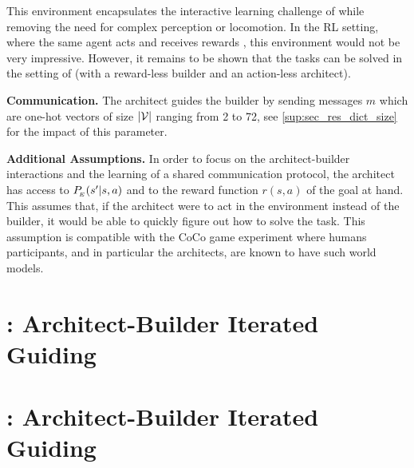 This environment encapsulates the interactive learning challenge of \abp while removing the need for complex perception or locomotion. 
In the RL setting, where the same agent acts and receives rewards%
, this environment would not be very impressive. However, it remains to be shown that the tasks can be solved in the %
setting of \abp (with a reward-less builder and an action-less architect).

\textbf{Communication. } The architect guides the builder by sending messages $m$ which are one-hot vectors of size $|{\mathcal{V}}|$ ranging from 2 to 72, see \ap\ref{sup:sec_res_dict_size} for the impact of this parameter.

\textbf{Additional Assumptions. }  In order to focus on the architect-builder interactions and the learning of a shared communication protocol, the architect has access to $P_{\!_E}(s'|s,a)$ and to the reward function $r(s,a)$ of the goal at hand. This assumes that, if the architect were to act in the environment instead of the builder, it would be able to quickly figure out how to solve the task. This assumption is compatible with the CoCo game experiment \cite{vollmer2014studying} where humans participants, and in particular the architects, are known to have such world models.


\section{\abig: Architect-Builder Iterated Guiding}

\section{\abig: Architect-Builder Iterated Guiding}
